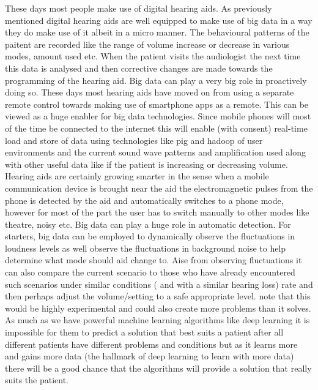 \documentclass[sigconf]{acmart}
\begin{document}
\newline
 These days most people make use of digital hearing aids. As previously mentioned digital hearing aids are well equipped to make use of big data in a way they do make use of it albeit in a micro manner. The behavioural patterns of the paitent are recorded like the range of volume increase or decrease in various modes, amount used etc. When the patient visits the audiologist the next time this data is analysed and then corrective changes are made towards the programming of the hearing aid. Big data can play a very big role in proactively doing so. These days most hearing aids have moved on from using a separate remote control towards making use of smartphone apps as a remote. This can be viewed as a huge enabler for big data technologies. Since mobile phones will most of the time be connected to the internet this will enable (with consent) real-time load and store of data using technologies like pig and hadoop of user environments and the current sound wave patterns and amplification used along with other useful data like if the patient is increasing or decreasing volume. Hearing aids are certainly growing smarter in the sense when a mobile communication device is brought near the aid the electromagnetic pulses from the phone is detected by the aid and automatically switches to a phone mode, however for most of the part the user has to switch manually to other modes like theatre, noisy etc. Big data can play a huge role in automatic detection. For starters, big data can be employed to dynamically observe the fluctuations in loudness levels as well observe the fluctuations in background noise to help determine what mode should aid change to. Aise from observing fluctuations it can also compare the current scenario to those who have already encountered such scenarios under similar conditions ( and with a similar hearing loss) rate and then perhaps adjust the volume/setting to a safe appropriate level. note that this would be highly experimental and could also create more problems than it solves. As much as we have powerful machine learning algorithms like deep learning it is impossible for them to predict a solution that best suits a patient after all different patients have different problems and conditions but as it learns more and gains more data (the hallmark of deep learning to learn with more data) there will be a good chance that the algorithms will  provide a solution that really suits the patient.
 \newline
\end{document}

